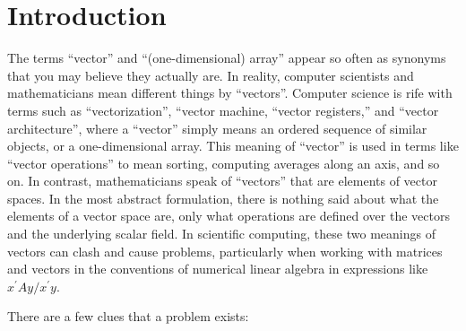 \section{Introduction}

The terms ``vector'' and ``(one-dimensional) array'' appear so often as
synonyms that you may believe they actually are. In reality, computer
scientists and mathematicians mean different things by ``vectors''.  Computer
science is rife with terms such as ``vectorization'', ``vector machine,
``vector registers,'' and ``vector architecture'', where a ``vector''
simply means an ordered sequence of similar objects, or a one-dimensional
array. This meaning of ``vector'' is used in terms like ``vector operations''
to mean sorting, computing averages along an axis, and so on.
In contrast, mathematicians speak of ``vectors'' that are elements of
vector spaces. In the most abstract formulation, there is nothing said about
what the elements of a vector space are, only what operations are defined over
the vectors and the underlying scalar field.
In scientific computing, these two meanings of vectors can clash and cause
problems, particularly when working with matrices and vectors in the
conventions of numerical linear algebra in expressions like
$x^\prime Ay/x^\prime y$.

There are a few clues that a problem exists:


